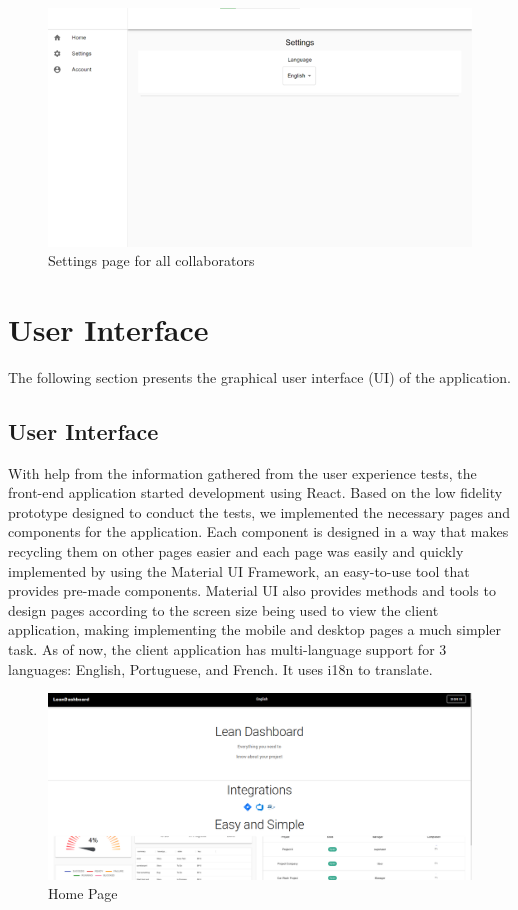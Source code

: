 \documentclass[a4paper,twoside,10pt]{report}
\begin{document}
\begin{figure}[h!]
\center
  \includegraphics[width=\textwidth]{settingsPageForCollaborators.png}
\caption{Settings page for all collaborators}
\end{figure}



\chapter{User Interface}
The following section presents the graphical user interface (UI) of the application.
\section{User Interface}
With help from the information gathered from the user experience tests, the front-end application started development using React.
\newline
Based on the low fidelity prototype designed to conduct the tests, we implemented the necessary pages and components for the application.
\newline
Each component is designed in a way that makes recycling them on other pages easier and each page was easily and quickly implemented by using the Material UI Framework, an easy-to-use tool that provides pre-made components.
Material UI also provides methods and tools to design pages according to the screen size being used to view the client application, making implementing the mobile and desktop pages a much simpler task.
\newline
As of now, the client application has multi-language support for 3 languages: English, Portuguese, and French. It uses i18n to translate.
 
\begin{figure}[h!]
\center
  \includegraphics[width=\textwidth]{HomePage.png}
\caption{Home Page}
\end{figure}
\end{document}
